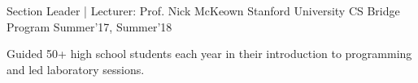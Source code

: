 \begin{cventries}
  \cventry
    {Section Leader | Lecturer: Prof. Nick McKeown } %
    {Stanford University CS Bridge Program} %
    {}
    {Summer'17, Summer'18} %
    {
      \begin{cvitems} %
        \item {Guided 50+ high school students each year in their introduction to programming and led laboratory sessions.}
      \end{cvitems}
    }

\end{cventries}

